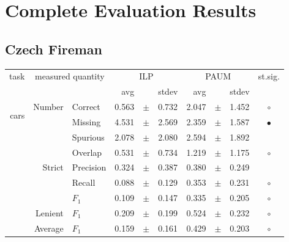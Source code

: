 \chapter{Complete Evaluation Results}

\section{Czech Fireman} \label{sec:complete_eval_fire}

\begin{longtable}{|r|r|l||rcl|rcl|c|}
\hline
\multirow{2}{*}{task} & \multicolumn{2}{|c||}{\multirow{2}{*}{measured quantity}} & \multicolumn{3}{|c|}{ILP} & \multicolumn{3}{|c|}{PAUM} & \multirow{2}{*}{st.sig.}\\
\cline{4-9}
  & \multicolumn{2}{|c||}{} &  avg  &    &  stdev  &  avg  &    &  stdev  & \\
\hline
\endhead
\hline
\hline
\multirow{11}{*}{\begin{sideways}cars\end{sideways} }
             & \multirow{4}{*}{    Number} &         Correct &       0.563 &  $\pm$  &       0.732 &       2.047 &  $\pm$  &       1.452 & $\circ$ \\
\cline{3-10} &                             &         Missing &       4.531 &  $\pm$  &       2.569 &       2.359 &  $\pm$  &       1.587 & $\bullet$ \\
\cline{3-10} &                             &        Spurious &       2.078 &  $\pm$  &       2.080 &       2.594 &  $\pm$  &       1.892 &  \\
\cline{3-10} &                             &         Overlap &       0.531 &  $\pm$  &       0.734 &       1.219 &  $\pm$  &       1.175 & $\circ$ \\
\cline{2-10} & \multirow{3}{*}{    Strict} &       Precision &       0.324 &  $\pm$  &       0.387 &       0.380 &  $\pm$  &       0.249 &  \\
\cline{3-10} &                             &          Recall &       0.088 &  $\pm$  &       0.129 &       0.353 &  $\pm$  &       0.231 & $\circ$ \\
\cline{3-10} &                             &           $F_1$ &       0.109 &  $\pm$  &       0.147 &       0.335 &  $\pm$  &       0.205 & $\circ$ \\
\cline{2-10} &                     Lenient &           $F_1$ &       0.209 &  $\pm$  &       0.199 &       0.524 &  $\pm$  &       0.232 & $\circ$ \\
\cline{2-10} &                     Average &           $F_1$ &       0.159 &  $\pm$  &       0.161 &       0.429 &  $\pm$  &       0.203 & $\circ$ \\

\end{longtable}

